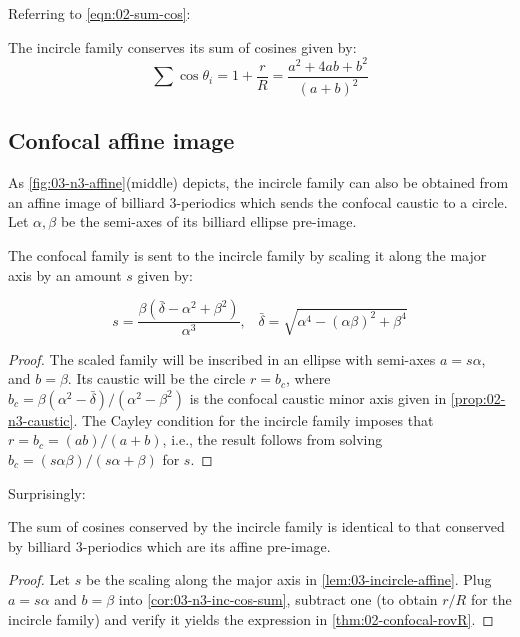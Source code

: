 Referring to \cref{eqn:02-sum-cos}: 

\begin{corollary}
The incircle family conserves its sum of cosines given by:
\[ \sum{\cos\theta_i}=1+\frac{r}{R}=\frac{{a}^2+4 {a}
   {b}+{b}^2}{({a}+{b})^2}\]
\label{cor:03-n3-inc-cos-sum}
\end{corollary}

\subsection{Confocal affine image} As \cref{fig:03-n3-affine}(middle) depicts, the incircle family can also be obtained from an affine image of billiard 3-periodics which sends the confocal caustic to a circle. Let $\alpha,\beta$ be the semi-axes of its billiard ellipse pre-image.

\begin{lemma}
The confocal family is sent to the incircle family by scaling it along the major axis by an amount $s$ given by:

\[ s=\frac{\beta (\bar{\delta}-\alpha^2+\beta^2)}{\alpha^3},\;\;\; \bar{\delta}=\sqrt{\alpha^4-(\alpha \beta)^2+\beta^4}\]

\label{lem:03-incircle-affine}
\end{lemma}

\begin{proof}
The scaled family will be inscribed in an ellipse with semi-axes $a = s \alpha$, and $b =\beta$. Its caustic will be the circle $r=b_c$, where $b_c={\beta\left({\alpha}^{2}-\bar{\delta}\right)}/(\alpha^2-\beta^2)$ is the confocal caustic minor axis given in \cref{prop:02-n3-caustic}. The Cayley condition for the incircle family imposes that $r=b_c=(a b)/(a + b)$, i.e., the result follows from solving $b_c = (s \alpha \beta)/(s \alpha + \beta)$ for $s$.

\end{proof}

\noindent Surprisingly:

\begin{proposition}
The sum of cosines conserved by the incircle family is identical to that conserved by billiard 3-periodics which are its affine pre-image.
\label{prop:03-incircle-same-sum-cos}
\end{proposition}

\begin{proof}
Let $s$ be the scaling along the major axis in \cref{lem:03-incircle-affine}. Plug $a=s \alpha$ and $b=\beta$ into  \cref{cor:03-n3-inc-cos-sum}, subtract one (to obtain $r/R$ for the incircle family) and verify it yields the expression in \cref{thm:02-confocal-rovR}.
\end{proof}

